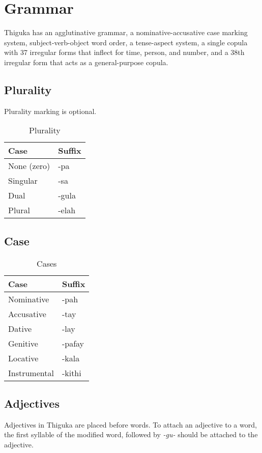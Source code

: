
\newpage
\section{Grammar}
Thiguka has an agglutinative grammar, a nominative-accusative case marking system, subject-verb-object word order, a tense-aspect system, a single copula with 37 irregular forms that inflect for time, person, and number, and a 38th irregular form that acts as a general-purpose copula.

\subsection{Plurality}
Plurality marking is optional.

\begin{table}[h!]
    \centering
    \begin{tabularx}{8cm}{|X|X|}
        \hline
        \textbf{Case} & \textbf{Suffix} \\
        \hline
        None (zero) & -pa \\
        Singular & -sa \\
        Dual & -gula \\
        Plural & -elah \\
        \hline
    \end{tabularx}
    \caption{Plurality}
\end{table}

\subsection{Case}
\begin{table}[h!]
    \centering
    \begin{tabularx}{8cm}{|X|X|}
        \hline
        \textbf{Case} & \textbf{Suffix} \\
        \hline
        Nominative & -pah \\
        Accusative & -tay \\
        Dative & -lay \\
        Genitive & -pafay \\
        Locative & -kala \\
        Instrumental & -kithi \\ 
        \hline
    \end{tabularx}
    \caption{Cases}
\end{table}

\subsection{Adjectives}
Adjectives in Thiguka are placed before words. To attach an adjective to a word, the first syllable of the modified word, followed by \emph{-gu-} should be attached to the adjective.

